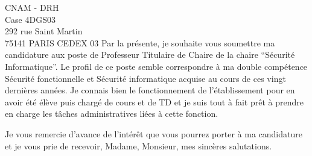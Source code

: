 \documentclass[a4paper,12pt]{lettre}
\begin{document}
\begin{letter}{
    CNAM - DRH\\
    Case 4DGS03\\
    292 rue Saint Martin\\ 
    75141 PARIS CEDEX 03}
Par la pr\'esente, je souhaite vous soumettre ma candidature aux poste
de Professeur Titulaire de Chaire de la chaire ``S\'ecurit\'e
Informatique''.  Le profil de ce poste semble correspondre \`a ma
double comp\'etence S\'ecurit\'e fonctionnelle et S\'ecurit\'e
informatique acquise au cours de ces vingt derni\`eres ann\'ees. Je
connais bien le fonctionnement de l'\'etablissement pour en avoir
\'et\'e \'el\`eve puis charg\'e de cours et de TD et je suis tout \`a
fait pr\^et \`a prendre en charge les t\^aches administratives li\'ees \`a
cette fonction.

 
\closing{Je vous remercie d'avance de l'int\'er\^et que vous pourrez porter \`a ma
candidature et je vous prie de recevoir, Madame, Monsieur, mes
sinc\`eres salutations.}


\end{letter}
\end{document}
